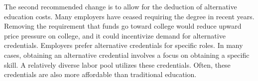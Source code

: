 \documentclass[review]{elsarticle}
\begin{document}

The second recommended change is to allow for the deduction of alternative education costs.
Many employers have ceased requiring the degree in recent years.
Removing the requirement that funds go toward college would reduce upward price pressure on college, and it could incentivize demand for alternative credentials.
Employers prefer alternative credentials for specific roles.
In many cases, obtaining an alternative credential involves a focus on obtaining a specific skill.
A relatively diverse labor pool utilizes these credentials.
Often, these credentials are also more affordable than traditional education.


\end{document}
